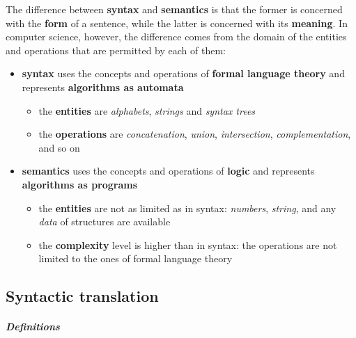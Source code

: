 \documentclass[english]{article}
\begin{document}
\bigskip
The difference between \textbf{syntax} and \textbf{semantics} is that the former is concerned with the \textbf{form} of a sentence, while the latter is concerned with its \textbf{meaning}.
In computer science, however, the difference comes from the domain of the entities and operations that are permitted by each of them:

\begin{itemize}
  \item \textbf{syntax} uses the concepts and operations of \textbf{formal language theory} and represents \textbf{algorithms as automata}
        \begin{itemize}[label=\(\rightarrow\)]
          \item the \textbf{entities} are \textit{alphabets}, \textit{strings} and \textit{syntax trees}
          \item the \textbf{operations} are \textit{concatenation}, \textit{union}, \textit{intersection}, \textit{complementation}, and so on
        \end{itemize}
  \item \textbf{semantics} uses the concepts and operations of \textbf{logic} and represents \textbf{algorithms as programs}
        \begin{itemize}[label=\(\rightarrow\)]
          \item the \textbf{entities} are not as limited as in syntax: \textit{numbers}, \textit{string}, and any \textit{data} of structures are available
          \item the \textbf{complexity} level is higher than in syntax: the operations are not limited to the ones of formal language theory
        \end{itemize}
\end{itemize}

\subsection{Syntactic translation}

\subparagraph*{Definitions}
\end{document}
